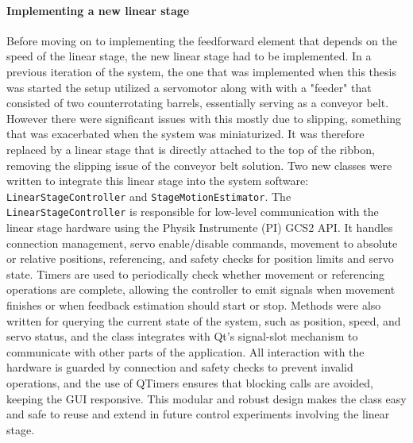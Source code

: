 \paragraph*{Implementing a new linear stage}
Before moving on to implementing the feedforward element that depends on the speed of the linear stage, the new linear stage had to be implemented. In a previous iteration of the system, the one that was implemented when this thesis was started the setup utilized a servomotor along with with a "feeder" that consisted of two counterrotating barrels, essentially serving as a conveyor belt. However there were significant issues with this mostly due to slipping, something that was exacerbated when the system was miniaturized. It was therefore replaced by a linear stage that is directly attached to the top of the ribbon, removing the slipping issue of the conveyor belt solution.
\newline \newline 
Two new classes were written to integrate this linear stage into the system software: \texttt{LinearStageController} and \texttt{StageMotionEstimator}. The \texttt{LinearStageController} is responsible for low-level communication with the linear stage hardware using the Physik Instrumente (PI) GCS2 API. It handles connection management, servo enable/disable commands, movement to absolute or relative positions, referencing, and safety checks for position limits and servo state. Timers are used to periodically check whether movement or referencing operations are complete, allowing the controller to emit signals when movement finishes or when feedback estimation should start or stop.
\newline \newline
Methods were also written for querying the current state of the system, such as position, speed, and servo status, and the class integrates with Qt’s signal-slot mechanism to communicate with other parts of the application. All interaction with the hardware is guarded by connection and safety checks to prevent invalid operations, and the use of QTimers ensures that blocking calls are avoided, keeping the GUI responsive. This modular and robust design makes the class easy and safe to  reuse and extend in future control experiments involving the linear stage.


